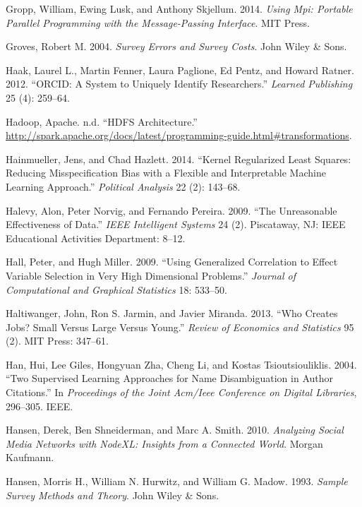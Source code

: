 \documentclass[]{krantz}
\begin{document}
\hypertarget{ref-mpi}{}
Gropp, William, Ewing Lusk, and Anthony Skjellum. 2014. \emph{Using Mpi:
Portable Parallel Programming with the Message-Passing Interface}. MIT
Press.

\hypertarget{ref-groves2004survey}{}
Groves, Robert M. 2004. \emph{Survey Errors and Survey Costs}. John
Wiley \& Sons.

\hypertarget{ref-haak2012orcid}{}
Haak, Laurel L., Martin Fenner, Laura Paglione, Ed Pentz, and Howard
Ratner. 2012. ``ORCID: A System to Uniquely Identify Researchers.''
\emph{Learned Publishing} 25 (4): 259--64.

\hypertarget{ref-SparkTransformation}{}
Hadoop, Apache. n.d. ``HDFS Architecture.''
\url{http://spark.apache.org/docs/latest/programming-guide.html\#transformations}.

\hypertarget{ref-hainmueller2014kernel}{}
Hainmueller, Jens, and Chad Hazlett. 2014. ``Kernel Regularized Least
Squares: Reducing Misspecification Bias with a Flexible and
Interpretable Machine Learning Approach.'' \emph{Political Analysis} 22
(2): 143--68.

\hypertarget{ref-halevy-09}{}
Halevy, Alon, Peter Norvig, and Fernando Pereira. 2009. ``The
Unreasonable Effectiveness of Data.'' \emph{IEEE Intelligent Systems} 24
(2). Piscataway, NJ: IEEE Educational Activities Department: 8--12.

\hypertarget{ref-HallMiller2009}{}
Hall, Peter, and Hugh Miller. 2009. ``Using Generalized Correlation to
Effect Variable Selection in Very High Dimensional Problems.''
\emph{Journal of Computational and Graphical Statistics} 18: 533--50.

\hypertarget{ref-haltiwanger2013creates}{}
Haltiwanger, John, Ron S. Jarmin, and Javier Miranda. 2013. ``Who
Creates Jobs? Small Versus Large Versus Young.'' \emph{Review of
Economics and Statistics} 95 (2). MIT Press: 347--61.

\hypertarget{ref-han2004two}{}
Han, Hui, Lee Giles, Hongyuan Zha, Cheng Li, and Kostas
Tsioutsiouliklis. 2004. ``Two Supervised Learning Approaches for Name
Disambiguation in Author Citations.'' In \emph{Proceedings of the Joint
Acm/Ieee Conference on Digital Libraries}, 296--305. IEEE.

\hypertarget{ref-hansen2010analyzing}{}
Hansen, Derek, Ben Shneiderman, and Marc A. Smith. 2010. \emph{Analyzing
Social Media Networks with NodeXL: Insights from a Connected World}.
Morgan Kaufmann.

\hypertarget{ref-hansen1993sample}{}
Hansen, Morris H., William N. Hurwitz, and William G. Madow. 1993.
\emph{Sample Survey Methods and Theory}. John Wiley \& Sons.
\end{document}
